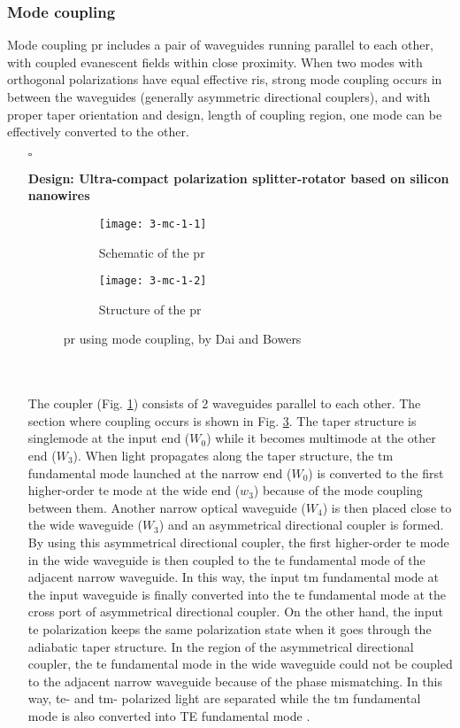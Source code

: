 \documentclass[../report.tex]{subfiles}
\begin{document}
			\subsubsection{Mode coupling} Mode coupling \gls{pr} includes a pair of waveguides running parallel to each other, with coupled evanescent fields within close proximity. When two modes with orthogonal polarizations have equal effective \gls{ri}s, strong mode coupling occurs in between the waveguides (generally asymmetric directional couplers), and with proper taper orientation and design, length of coupling region, one mode can be effectively converted to the other.
\begin{itemize}[leftmargin=*]
	\item[$\square$] \begin{minipage}[t]{\textwidth}\textbf{Design: Ultra-compact polarization splitter-rotator based on silicon nanowires}
	\begin{figure}[H] %
		\begin{subfigure}[t]{0.45\textwidth}
			\texttt{[image: 3-mc-1-1]}
			\caption{Schematic of the \gls{pr}}
			\label{fig:3_mc_1_1}
		\end{subfigure}
		\hfill
		\begin{subfigure}[t]{0.45\textwidth}
			\texttt{[image: 3-mc-1-2]}
			\caption{Structure of the \gls{pr}}
			\label{fig:3_mc_1_2}
		\end{subfigure}
		\caption{\gls{pr} using mode coupling, by Dai and Bowers \cite{dai_novel_2011}}
	\end{figure}
	\end{minipage}\\\\
	\noindent The coupler (Fig. \ref{fig:3_mc_1_1}) consists of 2 waveguides parallel to each other. The section where coupling occurs is shown in Fig. \ref{fig:3_mc_1_2}. The taper structure is singlemode at the input end ($W_0$) while it becomes multimode at the other end ($W_3$). When light propagates along the taper structure, the \gls{tm} fundamental mode launched at the narrow end ($W_0$) is converted to the first higher-order \gls{te} mode at the wide end ($w_3$) because of the mode coupling between them. Another narrow optical waveguide ($W_4$) is then placed close to the wide waveguide ($W_3$) and an asymmetrical directional coupler is formed. By using this asymmetrical directional coupler, the first higher-order \gls{te} mode in the wide waveguide is then coupled to the \gls{te} fundamental mode of the adjacent narrow waveguide. In this way, the input \gls{tm} fundamental mode at the input waveguide is finally converted into the \gls{te} fundamental mode at the cross port of asymmetrical directional coupler. On the other hand, the input \gls{te} polarization keeps the same polarization state when it goes through the adiabatic taper structure. In the region of the asymmetrical directional coupler, the \gls{te} fundamental mode in the wide waveguide could not be coupled to the adjacent narrow waveguide because of the phase mismatching. In this way, \gls{te}- and \gls{tm}- polarized light are separated while the \gls{tm} fundamental mode is also converted into TE fundamental mode \cite{dai_novel_2011}.\par	


\end{itemize}
\end{document}
